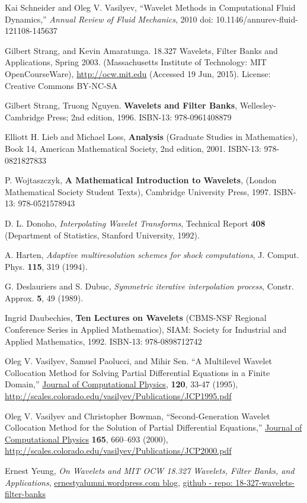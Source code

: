 \documentclass[twoside]{amsart}
\theoremstyle{plain}
\theoremstyle{definition}
\theoremstyle{remark}
\numberwithin{equation}{section}
\begin{document}
\begin{thebibliography}{9}

 Kai Schneider and Oleg V. Vasilyev, ``Wavelet Methods in Computational Fluid Dynamics,'' \emph{Annual Review of Fluid Mechanics}, 2010 doi: 10.1146/annurev-fluid-121108-145637

Gilbert Strang, and Kevin Amaratunga. 18.327 Wavelets, Filter Banks and Applications, Spring 2003. (Massachusetts Institute of Technology: MIT OpenCourseWare), \url{http://ocw.mit.edu} (Accessed 19 Jun, 2015). License: Creative Commons BY-NC-SA

Gilbert Strang, Truong Nguyen. \textbf{Wavelets and Filter Banks}, Wellesley-Cambridge Press; 2nd edition, 1996. ISBN-13: 978-0961408879

Elliott H. Lieb and Michael Loss, \textbf{Analysis} (Graduate Studies in Mathematics), Book 14, American Mathematical Society, 2nd edition, 2001. ISBN-13: 978-0821827833

P. Wojtaszczyk, \textbf{A Mathematical Introduction to Wavelets}, (London Mathematical Society Student Texts), Cambridge University Press, 1997. ISBN-13: 978-0521578943 

 D. L. Donoho, \emph{Interpolating Wavelet Transforms}, Technical Report \textbf{408} (Department of Statistics, Stanford University, 1992).

A. Harten, \emph{Adaptive multiresolution schemes for shock computations}, J. Comput. Phys. \textbf{115}, 319 (1994).

G. Deslauriers and S. Dubuc, \emph{Symmetric iterative interpolation process}, Constr. Approx. \textbf{5}, 49 (1989).


Ingrid Daubechies, \textbf{Ten Lectures on Wavelets} (CBMS-NSF Regional Conference Series in Applied Mathematics), SIAM: Society for Industrial and Applied Mathematics, 1992. ISBN-13: 978-0898712742 


Oleg V. Vasilyev, Samuel Paolucci, and Mihir Sen. ``A Multilevel Wavelet Collocation Method for Solving Partial Differential Equations in a Finite Domain,'' \underline{Journal of Computational Physics}, \textbf{120}, 33-47 (1995), \url{http://scales.colorado.edu/vasilyev/Publications/JCP1995.pdf}

Oleg V. Vasilyev and Christopher Bowman, ``Second-Generation Wavelet Collocation Method for the Solution of Partial Differential Equations,'' \underline{Journal of Computational Physics} \textbf{165}, 660–693 (2000), \url{http://scales.colorado.edu/vasilyev/Publications/JCP2000.pdf}

Ernest Yeung, \emph{On Wavelets and MIT OCW 18.327 Wavelets, Filter Banks, and Applications}, \href{https://ernestyalumni.files.wordpress.com/2015/07/onwavelets18_327.pdf}{ernestyalumni.wordpress.com blog}, \href{https://github.com/ernestyalumni/18-327-wavelets-filter-banks}{github - repo: 18-327-wavelets-filter-banks}

\end{thebibliography}
\end{document}
